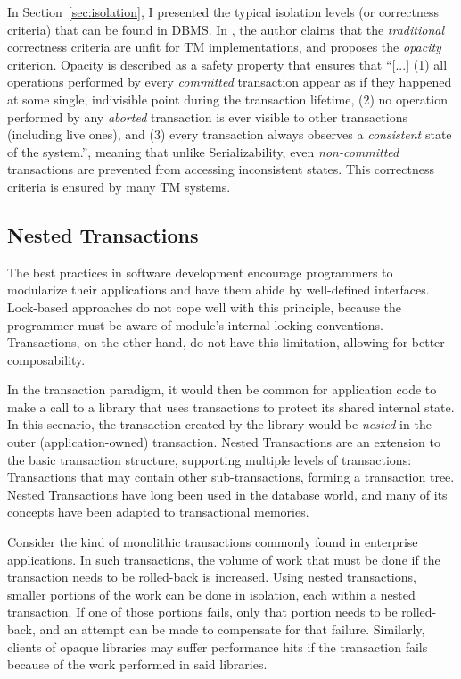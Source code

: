 In Section~\ref{sec:isolation}, I presented the typical isolation
levels (or correctness criteria) that can be found in DBMS. In
\cite{guerraoui2008correctness}, the author claims that the {\it
  traditional} correctness criteria are unfit for TM implementations,
and proposes the {\it opacity} criterion. Opacity is described as a
safety property that ensures that ``[...] (1) all operations performed
by every {\it committed} transaction appear as if they happened at
some single, indivisible point during the transaction lifetime, (2) no
operation performed by any {\it aborted} transaction is ever visible
to other transactions (including live ones), and (3) every transaction
always observes a {\it consistent} state of the system.'', meaning
that unlike Serializability, even {\it non-committed} transactions are
prevented from accessing inconsistent states. This correctness
criteria is ensured by many TM systems.

\subsection{Nested Transactions}

The best practices in software development encourage programmers to
modularize their applications and have them abide by well-defined
interfaces. Lock-based approaches do not cope well with this
principle, because the programmer must be aware of module's internal
locking conventions. Transactions, on the other hand, do not have this
limitation, allowing for better composability.

In the transaction paradigm, it would then be common for application
code to make a call to a library that uses transactions to protect its
shared internal state. In this scenario, the transaction created by
the library would be {\it nested} in the outer (application-owned)
transaction. Nested Transactions are an extension to the basic
transaction structure, supporting multiple levels of transactions:
Transactions that may contain other sub-transactions, forming a
transaction tree. Nested Transactions have long been used in the
database world, and many of its concepts have been adapted to
transactional memories.

Consider the kind of monolithic transactions commonly found in
enterprise applications. In such transactions, the volume of work that
must be done if the transaction needs to be rolled-back is
increased. Using nested transactions, smaller portions of the work can
be done in isolation, each within a nested transaction. If one of
those portions fails, only that portion needs to be rolled-back, and
an attempt can be made to compensate for that failure. Similarly,
clients of opaque libraries may suffer performance hits if the
transaction fails because of the work performed in said libraries.

